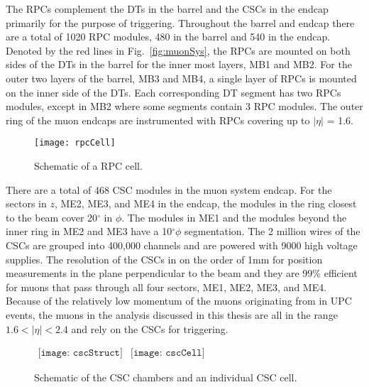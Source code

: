     The RPCs complement the DTs in the barrel and the CSCs in the endcap 
      primarily for the purpose of triggering.
    Throughout the barrel and endcap there are a total of 1020 RPC modules, 480
      in the barrel and 540 in the endcap.
    Denoted by the red lines in Fig.~\ref{fig:muonSys}, the RPCs are mounted on
      both sides of the DTs in the barrel for the inner most layers, MB1 and 
      MB2.
    For the outer two layers of the barrel, MB3 and MB4, a single layer of RPCs
      is mounted on the inner side of the DTs.
    Each corresponding DT segment has two RPCs modules, except in MB2 where 
      some segments contain 3 RPC modules. 
    The outer ring of the muon endcaps are instrumented with RPCs covering up to
      $|\eta|$ = 1.6.
    \begin{figure}[!Hhbt]
      \centering
      \texttt{[image: rpcCell]}
      \caption{Schematic of a RPC cell.}
      \label{fig:rpcSchem}
    \end{figure}
 
    There are a total of 468 CSC modules in the muon system endcap. 
    For the sectors in $z$, ME2, ME3, and ME4 in the endcap, the modules in 
      the ring closest to the beam cover 20$^{\circ}$ in $\phi$.
    The modules in ME1 and the modules beyond the inner ring in
      ME2 and ME3 have a 10$^{\circ} \phi$ segmentation.
    The 2 million wires of the CSCs are grouped into 400,000 channels and are
      powered with 9000 high voltage supplies. 
    The resolution of the CSCs in on the order of 1mm for position measurements 
      in the plane perpendicular to the beam and they are 99\% efficient for muons
      that pass through all four sectors, ME1, ME2, ME3, and ME4.
    Because of the relatively low momentum of the muons originating from \JPsi{}
      in UPC events, the muons in the analysis discussed in this thesis are all
      in the range $1.6 < |\eta| < 2.4$ and rely on the CSCs for triggering. 
    \begin{figure}[!Hhbt]
      \centering
      $ \begin{array}{cc}
        \texttt{[image: cscStruct]} &
        \texttt{[image: cscCell]}
      \end{array} $
      \caption{Schematic of the CSC chambers and an individual CSC cell.}
      \label{fig:cscSchem}
    \end{figure}

